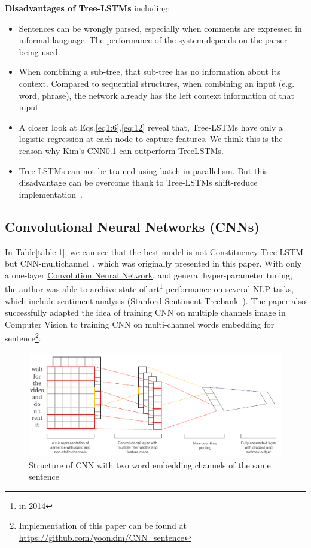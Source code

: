 \textbf{Disadvantages of Tree-LSTMs} including:\label{treelstm-drawback}
\begin{itemize}
\item Sentences can be wrongly parsed, especially when comments are expressed in informal language.
The performance of the system depends on the parser being used.
\item When combining a sub-tree, that sub-tree has no information about its context.
Compared to sequential structures, when combining an input (e.g. word, phrase), the network already has the left context information of that input~\cite{shift-reduce}.
\item A closer look at Eqs.\eqref{eq1:6},\eqref{eq:12} reveal that, Tree-LSTMs have only a logistic regression at each node to capture features.
We think this is the reason why Kim's CNN\ref{kim-cnn} can outperform TreeLSTMs.
\item Tree-LSTMs can not be trained using batch in parallelism. But this disadvantage can be overcome thank to Tree-LSTMs shift-reduce implementation~\cite{shift-reduce}.
\end{itemize}


\subsection{Convolutional Neural Networks (CNNs)}\label{kim-cnn}
In Table\ref{table:1}, we can see that the best model is not Constituency Tree-LSTM but CNN-multichannel~\cite{KimCNN}, which was originally presented in this paper.
With only a one-layer \hyperref[sec:cnn]{Convolution Neural Network}, and general hyper-parameter tuning, the author was able to archive state-of-art\footnote{in 2014} performance on several NLP tasks, which include sentiment analysis (\hyperref[sec:sst]{Stanford Sentiment Treebank}~\cite{socher2013recursive}).
The paper also successfully adapted the idea of training CNN on multiple channels image in Computer Vision to training CNN on multi-channel words embedding for sentence\footnote{Implementation of this paper can be found at \url{https://github.com/yoonkim/CNN\_sentence}}.

\begin{figure}[H]
    \centering
    \includegraphics[scale=0.33]{figure/sentencecnn}
    \caption[CNN with two embedding channel]{Structure of CNN with two word embedding channels of the same sentence}
    \label{fig:multi-cnn}
\end{figure}


